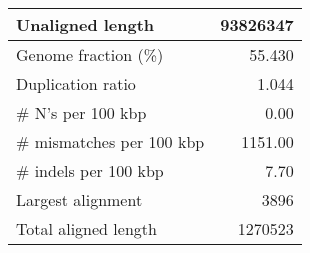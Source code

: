 \documentclass[12pt,a4paper]{article}
\begin{document}
\begin{table}[ht]
\begin{center}
\begin{tabular}{|l*{1}{|r}|}
Unaligned length & 93826347 \\ \hline
Genome fraction (\%) & 55.430 \\ \hline
Duplication ratio & 1.044 \\ \hline
\# N's per 100 kbp & 0.00 \\ \hline
\# mismatches per 100 kbp & 1151.00 \\ \hline
\# indels per 100 kbp & 7.70 \\ \hline
Largest alignment & 3896 \\ \hline
Total aligned length & 1270523 \\ \hline
\end{tabular}
\end{center}
\end{table}
\end{document}
